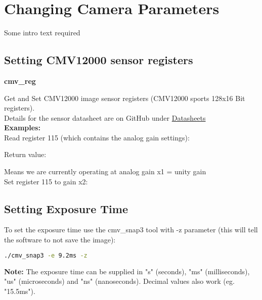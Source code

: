 \section{Changing Camera Parameters}

Some intro text required\\

\subsection{Setting CMV12000 sensor registers}

\textbf{cmv\_reg}

Get and Set CMV12000 image sensor registers (CMV12000 sports 128x16 Bit registers).\\

Details for the sensor datasheet are on GitHub under \href{https://github.com/apertus-open-source-cinema/beta-hardware/tree/master/Datasheets}{Datasheets}\\

\textbf{Examples:}\\

Read register 115 (which contains the analog gain settings): 


Return value:

Means we are currently operating at analog gain x1 = unity gain\\

Set register 115 to gain x2: 

\subsection{Setting Exposure Time}

To set the exposure time use the cmv\_snap3 tool with -z parameter (this will tell the software to not save the image): 

\begin{lstlisting}[language=bash,morekeywords=$,keywordstyle=\bfseries,frame=none,xleftmargin=.25in,belowskip=2em, aboveskip=2em]
./cmv_snap3 -e 9.2ms -z
\end{lstlisting}

\textbf{Note:} The exposure time can be supplied in "s" (seconds), "ms" (milliseconds), "us" (microseconds) and "ns" (nanoseconds). Decimal values also work (eg. "15.5ms"). 



